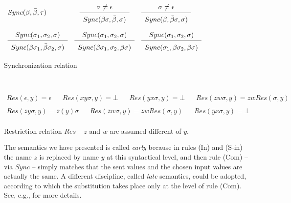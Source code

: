 \documentclass[submission,copyright,creativecommons]{eptcs}
\newcommand{\bigfrac}[2]{
\renewcommand{\arraystretch}{1.5}
\begin{array}{c}#1\\
\hline
#2
\end{array}}
\newcommand{\undef}{\mbox{$\bot$}}
\begin{document}
\begin{table}
\hrulefill\\[-.8cm]
\begin{center}
$\begin{array}{lcl}
Sync(\beta, \bar{\beta}, \tau) &  \bigfrac{\sigma \neq \epsilon}{Sync(\beta\sigma, \bar{\beta}, \sigma)} &
\bigfrac{\sigma \neq \epsilon}{Sync(\beta, \bar{\beta}\sigma, \sigma)} \\
\bigfrac{Sync(\sigma_1, \sigma_2, \sigma)}{Sync(\beta\sigma_1, \bar{\beta}\sigma_2, \sigma)} &
 \bigfrac{Sync(\sigma_1, \sigma_2, \sigma)}{Sync(\beta\sigma_1, \sigma_2, \beta\sigma)} & 
 \bigfrac{Sync(\sigma_1, \sigma_2, \sigma)}{Sync(\sigma_1, \beta\sigma_2, \beta\sigma)} \\
\end{array}$
\end{center}

\hrulefill%
\caption{Synchronization relation}\label{sync}
\end{table}


\begin{table}
\hrulefill\\[-.7cm]
{\renewcommand{\arraystretch}{3}}

\begin{center}
$\begin{array}{llllllllllll}
Res(\epsilon, y)  =  \epsilon & \; \;  \;
Res(xy \sigma, y) =  \undef  & \; \; \;  Res(yx \sigma, y)  =  \undef & \; \; \;
Res(zw \sigma, y)  =  zw Res(\sigma, y) \\
\end{array}$
$\begin{array}{llllllllllll}
Res(\bar zy \sigma, y) =  \bar z(y) \sigma & \; \;  \;  Res(\bar zw \sigma, y)  =  \bar zw Res(\sigma, y) & \; \; \;
Res(\bar yx \sigma, y)  =  \undef  \\[-.7cm]
\end{array}$
\end{center}

\hrulefill
\caption{Restriction relation $Res$ -- $z$ and $w$ are assumed different of $y$.}\label{restr}
\end{table}

The semantics we have presented is called {\em early} because in rules (In) and (S-in) the name $z$ is replaced by name $y$ at
this syntactical level, and then rule (Com) -- via $Sync$ --  simply matches that the sent values and the chosen 
input values are actually the same. A different discipline, called {\em late} semantics, could be 
adopted, according to which the substitution takes place only at the level of rule (Com).
See, e.g., \cite{SW} for more details. 
\end{document}
